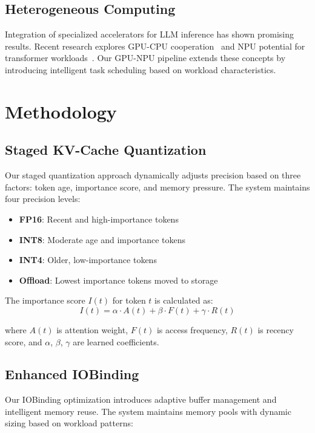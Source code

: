 \documentclass[twocolumn,10pt]{article}
\begin{document}
\subsection{Heterogeneous Computing}

Integration of specialized accelerators for LLM inference has shown promising results. Recent research explores GPU-CPU cooperation~\cite{aminabadi2022deepspeed} and NPU potential for transformer workloads~\cite{park2023neurosurgeon}. Our GPU-NPU pipeline extends these concepts by introducing intelligent task scheduling based on workload characteristics.

\section{Methodology}

\subsection{Staged KV-Cache Quantization}

Our staged quantization approach dynamically adjusts precision based on three factors: token age, importance score, and memory pressure. The system maintains four precision levels:

\begin{itemize}
\item \textbf{FP16}: Recent and high-importance tokens
\item \textbf{INT8}: Moderate age and importance tokens
\item \textbf{INT4}: Older, low-importance tokens
\item \textbf{Offload}: Lowest importance tokens moved to storage
\end{itemize}

The importance score $I(t)$ for token $t$ is calculated as:
\begin{equation}
I(t) = \alpha \cdot A(t) + \beta \cdot F(t) + \gamma \cdot R(t)
\end{equation}

where $A(t)$ is attention weight, $F(t)$ is access frequency, $R(t)$ is recency score, and $\alpha$, $\beta$, $\gamma$ are learned coefficients.

\subsection{Enhanced IOBinding}

Our IOBinding optimization introduces adaptive buffer management and intelligent memory reuse. The system maintains memory pools with dynamic sizing based on workload patterns:
\end{document}
